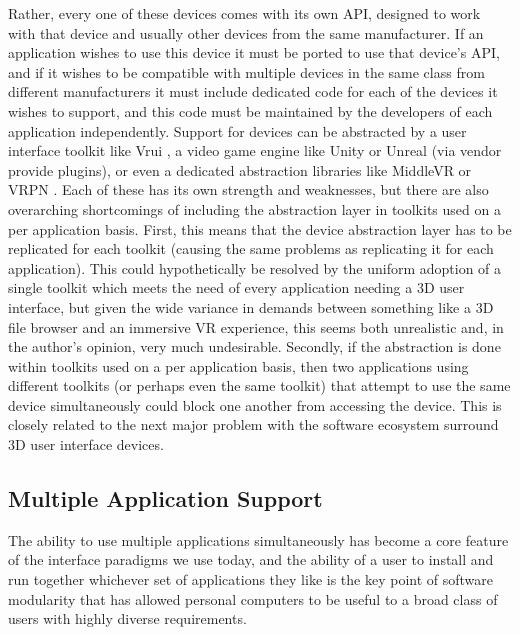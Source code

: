 Rather, every one of these devices comes with its own API, designed to work with that device and usually other devices from the same manufacturer. If an application wishes to use this device it must be ported to use that device's API, and if it wishes to be compatible with multiple devices in the same class from different manufacturers it must include dedicated code for each of the devices it wishes to support, and this code must be maintained by the developers of each application independently. Support for devices can be abstracted by a user interface toolkit like Vrui \cite{vrui}, a video game engine like Unity or Unreal (via vendor provide plugins), or even a dedicated abstraction libraries like MiddleVR \cite{middle-vr} or VRPN \cite{vrpn}. Each of these has its own strength and weaknesses, but there are also overarching shortcomings of including the abstraction layer in toolkits used on a per application basis. First, this means that the device abstraction layer has to be replicated for each toolkit (causing the same problems as replicating it for each application). This could hypothetically be resolved by the uniform adoption of a single toolkit which meets the need of every application needing a 3D user interface, but given the wide variance in demands between something like a 3D file browser and an immersive VR experience, this seems both unrealistic and, in the author's opinion, very much undesirable. Secondly, if the abstraction is done within toolkits used on a per application basis, then two applications using different toolkits (or perhaps even the same toolkit) that attempt to use the same device simultaneously could block one another from accessing the device. This is closely related to the next major problem with the software ecosystem surround 3D user interface devices.

\subsection{Multiple Application Support}

The ability to use multiple applications simultaneously has become a core feature of the interface paradigms we use today, and the ability of a user to install and run together whichever set of applications they like is the key point of software modularity that has allowed personal computers to be useful to a broad class of users with highly diverse requirements.
 
